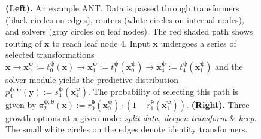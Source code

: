 \begin{figure}[ht]
\begin{subfigure}[]{0.52\linewidth}
	\end{subfigure}
	\caption{\small \textbf{(Left).} An example ANT. Data is passed through transformers (black circles on edges), routers (white circles on internal nodes), and solvers (gray circles on leaf nodes). The red shaded path shows routing of $\mathbf{x}$ to reach leaf node $4$. Input $\mathbf{x}$ undergoes a series of selected transformations $\mathbf{x}\rightarrow \mathbf{x}^{\boldsymbol{\psi}}_0:=t^{\boldsymbol{\psi}}_0(\mathbf{x})\rightarrow \mathbf{x}^{\boldsymbol{\psi}}_1:=t^{\boldsymbol{\psi}}_1(\mathbf{x}^{\boldsymbol{\psi}}_0) \rightarrow \mathbf{x}^{\boldsymbol{\psi}}_4:=t^{\boldsymbol{\psi}}_4(\mathbf{x}^{\boldsymbol{\psi}}_1)$ and the solver module yields the predictive distribution $p_{4}^{\boldsymbol{\phi}, \boldsymbol{\psi}}(\mathbf{y}):= s^{\boldsymbol{\phi}}_4(\mathbf{x}^{\boldsymbol{\psi}}_4)$. The probability of selecting this path is given by $\pi_{2}^{\boldsymbol{\psi}, \boldsymbol{\theta}}(\mathbf{x}) := r_{0}^{\boldsymbol{\theta}}(\mathbf{x}^{\boldsymbol{\psi}}_0)\cdot(1-r_{1}^{\boldsymbol{\theta}}(\mathbf{x}^{\boldsymbol{\psi}}_1)).$ \textbf{(Right).} Three growth options at a given node: \textit{split data, deepen transform} \& \textit{keep}. The small white circles on the edges denote identity transformers.}
	\label{fig:hierarchy}
\end{figure}


